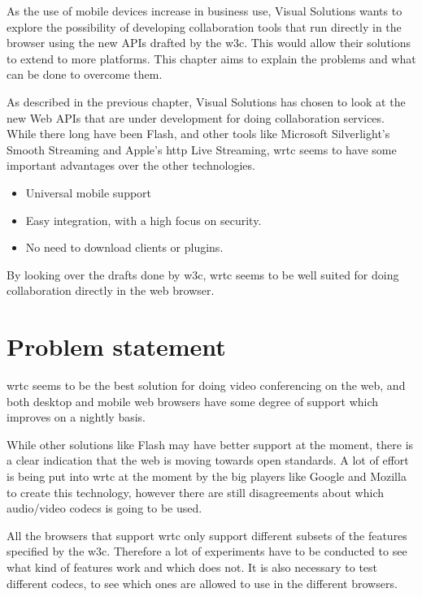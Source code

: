 
As the use of mobile devices increase in business use, Visual Solutions wants to explore the possibility of developing collaboration tools that run directly in the browser using the new APIs drafted by the \gls{w3c}. This would allow their solutions to extend to more platforms. This chapter aims to explain the problems and what can be done to overcome them.

As described in the previous chapter, Visual Solutions has chosen to look at the new Web APIs that are under development for doing collaboration services. While there long have been Flash, and other tools like Microsoft Silverlight's Smooth Streaming and Apple's \gls{http} Live Streaming, \gls{wrtc} seems to have some important advantages over the other technologies.

\begin{itemize}
    \item Universal mobile support
    \item Easy integration, with a high focus on security.
    \item No need to download clients or plugins.
\end{itemize}

By looking over the drafts done by \gls{w3c}, \gls{wrtc} seems to be well suited for doing collaboration directly in the web browser.

\section{Problem statement}
\gls{wrtc} seems to be the best solution for doing video conferencing on the web, and both desktop and mobile web browsers have some degree of support which improves on a nightly basis.

While other solutions like Flash may have better support at the moment, there is a clear indication that the web is moving towards open standards. A lot of effort is being put into \gls{wrtc} at the moment by the big players like Google and Mozilla to create this technology, however there are still disagreements about which audio/video codecs is going to be used\cite{philippe_video_2014}.

All the browsers that support \gls{wrtc} only support different subsets of the features specified by the \gls{w3c}. Therefore a lot of experiments have to be conducted to see what kind of features work and which does not. It is also necessary to test different codecs, to see which ones are allowed to use in the different browsers.

